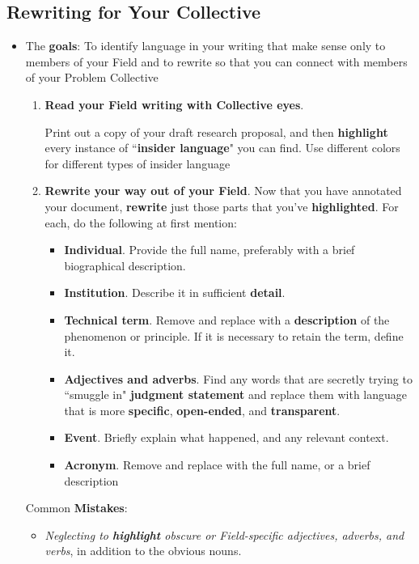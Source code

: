 \documentclass[11pt]{article}
\begin{document}
\subsection{Rewriting for Your Collective}
\begin{itemize}
\item \begin{exercise}
The \textbf{goals}: To identify language in your writing that make sense only to members of your Field and to rewrite so that you can connect with members of your Problem Collective

\begin{enumerate}
\item \textbf{Read your Field writing with Collective eyes}. 

Print out a copy of your draft research proposal, and then \textbf{highlight} every instance of ``\textbf{insider language}" you can find. Use different colors for different types of insider language

\item \textbf{Rewrite your way out of your Field}. Now that you have annotated your document, \textbf{rewrite} just
those parts that you’ve \textbf{highlighted}. For each, do the following at first mention:
\begin{itemize}
\item \textbf{Individual}. Provide the full name, preferably with a brief biographical description.
\item \textbf{Institution}. Describe it in sufficient \textbf{detail}.
\item \textbf{Technical term}. Remove and replace with a \textbf{description} of the phenomenon or principle. If it is necessary to retain the term, define it.
\item \textbf{Adjectives and adverbs}. Find any words that are secretly trying to ``smuggle in" \textbf{judgment statement} and replace them with language that is more \textbf{specific}, \textbf{open-ended}, and \textbf{transparent}.
\item \textbf{Event}. Briefly explain what happened, and any relevant context.
\item \textbf{Acronym}. Remove and replace with the full name, or a brief description
\end{itemize}
\end{enumerate}
\end{exercise}
Common \textbf{Mistakes}:
\begin{itemize}
\item \emph{Neglecting to \textbf{highlight} obscure or Field-specific adjectives, adverbs, and verbs}, in addition to the obvious nouns.


\end{itemize}
\end{itemize}
\end{document}
